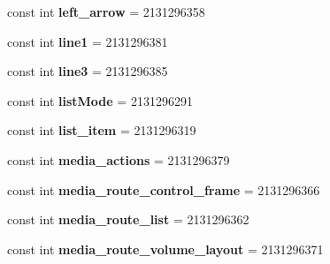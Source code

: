 \begin{DoxyCompactItemize}
\item 
\hypertarget{classClient_1_1Droid_1_1Resource_1_1Id_aa52acb4721b9098e1356f53e20f18259}{}const int {\bfseries left\+\_\+arrow} = 2131296358\label{classClient_1_1Droid_1_1Resource_1_1Id_aa52acb4721b9098e1356f53e20f18259}

\item 
\hypertarget{classClient_1_1Droid_1_1Resource_1_1Id_a8f3eabfb60d3fe2082f91716f8aa57b4}{}const int {\bfseries line1} = 2131296381\label{classClient_1_1Droid_1_1Resource_1_1Id_a8f3eabfb60d3fe2082f91716f8aa57b4}

\item 
\hypertarget{classClient_1_1Droid_1_1Resource_1_1Id_a3c5dd8b4b4590c34c12e32de14d862f7}{}const int {\bfseries line3} = 2131296385\label{classClient_1_1Droid_1_1Resource_1_1Id_a3c5dd8b4b4590c34c12e32de14d862f7}

\item 
\hypertarget{classClient_1_1Droid_1_1Resource_1_1Id_aa307216d5d4ccd95ba44c39789c14299}{}const int {\bfseries list\+Mode} = 2131296291\label{classClient_1_1Droid_1_1Resource_1_1Id_aa307216d5d4ccd95ba44c39789c14299}

\item 
\hypertarget{classClient_1_1Droid_1_1Resource_1_1Id_a9132661ad3d71e918a3994d164655008}{}const int {\bfseries list\+\_\+item} = 2131296319\label{classClient_1_1Droid_1_1Resource_1_1Id_a9132661ad3d71e918a3994d164655008}

\item 
\hypertarget{classClient_1_1Droid_1_1Resource_1_1Id_a6449aab136ad2ffff9dc71978ab39179}{}const int {\bfseries media\+\_\+actions} = 2131296379\label{classClient_1_1Droid_1_1Resource_1_1Id_a6449aab136ad2ffff9dc71978ab39179}

\item 
\hypertarget{classClient_1_1Droid_1_1Resource_1_1Id_a63c170d39aab74b76e3e615b0f0d3e3b}{}const int {\bfseries media\+\_\+route\+\_\+control\+\_\+frame} = 2131296366\label{classClient_1_1Droid_1_1Resource_1_1Id_a63c170d39aab74b76e3e615b0f0d3e3b}

\item 
\hypertarget{classClient_1_1Droid_1_1Resource_1_1Id_a3f70ef0318a3a66635b54e3279252246}{}const int {\bfseries media\+\_\+route\+\_\+list} = 2131296362\label{classClient_1_1Droid_1_1Resource_1_1Id_a3f70ef0318a3a66635b54e3279252246}

\item 
\hypertarget{classClient_1_1Droid_1_1Resource_1_1Id_ab06398e612361aef127cd4678e21cac9}{}const int {\bfseries media\+\_\+route\+\_\+volume\+\_\+layout} = 2131296371\label{classClient_1_1Droid_1_1Resource_1_1Id_ab06398e612361aef127cd4678e21cac9}


\end{DoxyCompactItemize}
